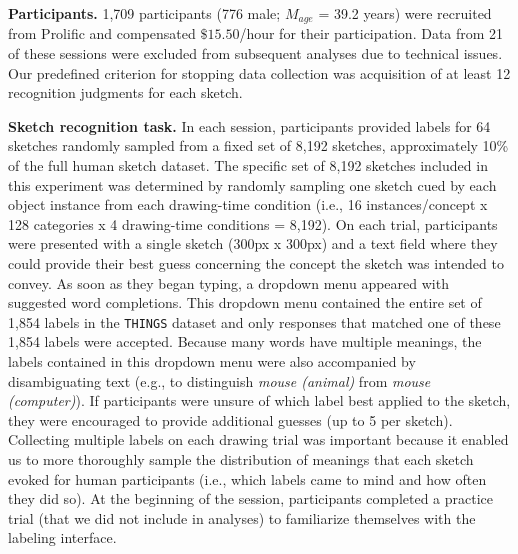 \documentclass{article}
\begin{document}

\vspace{1em}
\textbf{Participants.}
1,709 participants (776 male; $M_{age}$ = 39.2 years) were recruited from Prolific and compensated $\$15.50$/hour for their participation. %
Data from 21 of these sessions were excluded from subsequent analyses due to technical issues.
Our predefined criterion for stopping data collection was acquisition of at least 12 recognition judgments for each sketch. 


\textbf{Sketch recognition task.}
In each session, participants provided labels for 64 sketches randomly sampled from a fixed set of 8,192 sketches, approximately 10\% of the full human sketch dataset. 
The specific set of 8,192 sketches included in this experiment was determined by randomly sampling one sketch cued by each object instance from each drawing-time condition (i.e., 16 instances/concept x 128 categories x 4 drawing-time conditions = 8,192). 
On each trial, participants were presented with a single sketch (300px x 300px) and a text field where they could provide their best guess concerning the concept the sketch was intended to convey. 
As soon as they began typing, a dropdown menu appeared with suggested word completions.
This dropdown menu contained the entire set of 1,854 labels in the \texttt{THINGS} dataset and only responses that matched one of these 1,854 labels were accepted. 
Because many words have multiple meanings, the labels contained in this dropdown menu were also accompanied by disambiguating text (e.g., to distinguish \textit{mouse (animal)} from \textit{mouse (computer)}). 
If participants were unsure of which label best applied to the sketch, they were encouraged to provide additional guesses (up to 5 per sketch). %
Collecting multiple labels on each drawing trial was important because it enabled us to more thoroughly sample the distribution of meanings that each sketch evoked for human participants (i.e., which labels came to mind and how often they did so). 
At the beginning of the session, participants completed a practice trial (that we did not include in analyses) to familiarize themselves with the labeling interface.
\end{document}
